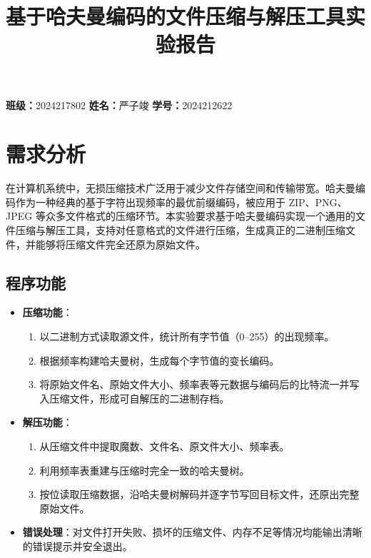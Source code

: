 \documentclass[UTF8]{ctexart}
\title{基于哈夫曼编码的文件压缩与解压工具实验报告}
\author{}
\begin{document}
\maketitle

\begin{center}
    \textbf{班级：}2024217802 \quad \textbf{姓名：}严子竣 \quad \textbf{学号：}2024212622
\end{center}

\section{需求分析}
在计算机系统中，无损压缩技术广泛用于减少文件存储空间和传输带宽。哈夫曼编码作为一种经典的基于字符出现频率的最优前缀编码，被应用于 ZIP、PNG、JPEG 等众多文件格式的压缩环节。本实验要求基于哈夫曼编码实现一个通用的文件压缩与解压工具，支持对任意格式的文件进行压缩，生成真正的二进制压缩文件，并能够将压缩文件完全还原为原始文件。

\subsection{程序功能}
\begin{itemize}
    \item \textbf{压缩功能}：
    \begin{enumerate}
        \item 以二进制方式读取源文件，统计所有字节值（0--255）的出现频率。
        \item 根据频率构建哈夫曼树，生成每个字节值的变长编码。
        \item 将原始文件名、原始文件大小、频率表等元数据与编码后的比特流一并写入压缩文件，形成可自解压的二进制存档。
    \end{enumerate}
    \item \textbf{解压功能}：
    \begin{enumerate}
        \item 从压缩文件中提取魔数、文件名、原文件大小、频率表。
        \item 利用频率表重建与压缩时完全一致的哈夫曼树。
        \item 按位读取压缩数据，沿哈夫曼树解码并逐字节写回目标文件，还原出完整原始文件。
    \end{enumerate}
    \item \textbf{错误处理}：对文件打开失败、损坏的压缩文件、内存不足等情况均能输出清晰的错误提示并安全退出。
\end{itemize}
\end{document}
